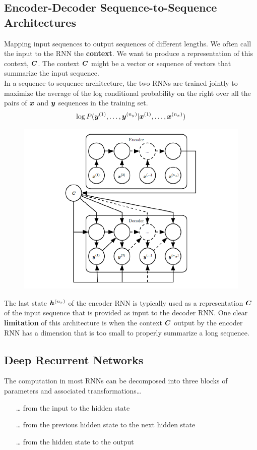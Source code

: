 \begin{multicols}{2}
	\subsection{Encoder-Decoder Sequence-to-Sequence Architectures}
	Mapping input sequences to output sequences of different lengths.
	We often call the input to the RNN the \textbf{context}. We want to produce a representation of this context, ${\bm{C}}$. The context ${\bm{C}}$ might be a vector or sequence of vectors that summarize the input sequence.\\
	In a sequence-to-sequence architecture, the two RNNs are trained jointly to maximize the average of the log conditional probability on the right over all the pairs of ${\bm{x}}$ and ${\bm{y}}$ sequences in the training set.
	\[ \log P({\bm{y}}^{(1)},\dots,{\bm{y}}^{(n_y)}|{\bm{x}}^{(1)},\dots,{\bm{x}}^{(n_x)}) \]
	\begin{figure}[H]
		\centering
		\includegraphics[width=0.8\linewidth]{images/encdec.png}
	\end{figure}
	The last state ${\bm{h}}^{(n_x)}$ of the encoder RNN is typically used as a representation ${\bm{C}}$ of the input sequence that is provided as input to the decoder RNN.
	One clear \textbf{limitation} of this architecture is when the context ${\bm{C}}$ output by the encoder RNN has a dimension that is too small to properly summarize a long sequence.

	\subsection{Deep Recurrent Networks}
	The computation in most RNNs can be decomposed into three blocks of parameters and associated transformations\dots
	\begin{itemize}
		\item[\dots] from the input to the hidden state
		\item[\dots] from the previous hidden state to the next hidden state
		\item[\dots] from the hidden state to the output
	\end{itemize}


\end{multicols}
